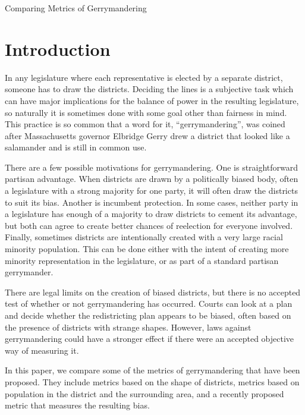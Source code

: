 \documentclass[12pt]{article}
\begin{document}
  \begin{center}
    \LARGE Comparing Metrics of Gerrymandering
    \vspace{-0.5em}
  \end{center}
  \nocite{*}
  \doublespacing{}

  \section{Introduction}

  In any legislature where each representative is elected by a separate district, someone has to draw the districts. Deciding the lines is a subjective task which can have major implications for the balance of power in the resulting legislature, so naturally it is sometimes done with some goal other than fairness in mind. This practice is so common that a word for it, ``gerrymandering'', was coined after Massachusetts governor Elbridge Gerry drew a district that looked like a salamander and is still in common use.

There are a few possible motivations for gerrymandering. One is straightforward partisan advantage. When districts are drawn by a politically biased body, often a legislature with a strong majority for one party, it will often draw the districts to suit its bias. Another is incumbent protection. In some cases, neither party in a legislature has enough of a majority to draw districts to cement its advantage, but both can agree to create better chances of reelection for everyone involved. Finally, sometimes districts are intentionally created with a very large racial minority population. This can be done either with the intent of creating more minority representation in the legislature, or as part of a standard partisan gerrymander.

There are legal limits on the creation of biased districts, but there is no accepted test of whether or not gerrymandering has occurred. Courts can look at a plan and decide whether the redistricting plan appears to be biased, often based on the presence of districts with strange shapes. However, laws against gerrymandering could have a stronger effect if there were an accepted objective way of measuring it.

In this paper, we compare some of the metrics of gerrymandering that have been proposed. They include metrics based on the shape of districts, metrics based on population in the district and the surrounding area, and a recently proposed metric that measures the resulting bias.
\end{document}
